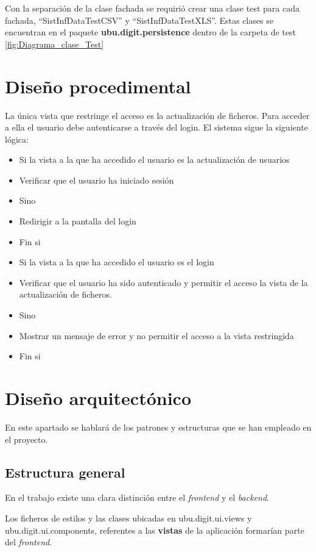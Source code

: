Con la separación de la clase fachada se requirió crear una clase test para cada fachada, ``SistInfDataTestCSV'' y ``SistInfDataTestXLS''. Estas clases se encuentran en el paquete \textbf{ubu.digit.persistence} dentro de la carpeta de test \ref{fig:Diagrama_clase_Test}


\section{Diseño procedimental}
La única vista que restringe el acceso es la actualización de ficheros. Para acceder a ella el usuario debe autenticarse a través del login. El sistema sigue la siguiente lógica:	
\begin{itemize}
	\item Si la vista a la que ha accedido el usuario es la actualización de usuarios
	\item Verificar que el usuario ha iniciado sesión 
	\item Sino 
	\item Redirigir a la pantalla del login
	\item Fin si
	
	\item Si la vista a la que ha accedido el usuario es el login
	\item Verificar que el usuario ha sido autenticado y permitir el acceso la vista de la actualización de ficheros.
	\item Sino 
	\item Mostrar un mensaje de error y no permitir el acceso a la vista restringida
	\item Fin si	
\end{itemize}

\section{Diseño arquitectónico}
En este apartado se hablará de los patrones y estructuras que se han empleado en el proyecto.

\subsection{Estructura general}
En el trabajo existe una clara distinción entre el \emph{frontend} y el \emph{backend}. 

Los ficheros de estilos y las clases ubicadas en ubu.digit.ui.views y ubu.digit.ui.components, referentes a las \textbf{vistas} de la aplicación formarían parte del \emph{frontend}. 

